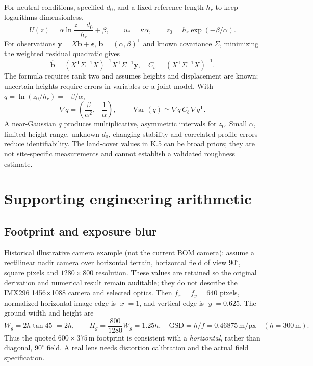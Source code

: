\documentclass[11pt,a4paper]{article}
\numberwithin{equation}{section}
\begin{document}
For neutral conditions, specified $d_0$, and a fixed reference length
$h_r$ to keep logarithms dimensionless,
\begin{equation}
 U(z)=\alpha\ln\frac{z-d_0}{h_r}+\beta,
 \qquad u_*=\kappa\alpha,\qquad
 z_0=h_r\exp(-\beta/\alpha).
\end{equation}
For observations $\boldsymbol y=X\boldsymbol b+\boldsymbol\epsilon$,
$\boldsymbol b=(\alpha,\beta)^{\mathsf T}$ and known covariance $\Sigma$,
minimizing the weighted residual quadratic gives
\begin{equation}
 \widehat{\boldsymbol b}=(X^{\mathsf T}\Sigma^{-1}X)^{-1}
                   X^{\mathsf T}\Sigma^{-1}\boldsymbol y,
 \quad C_b=(X^{\mathsf T}\Sigma^{-1}X)^{-1}.
\end{equation}
The formula requires rank two and assumes heights and displacement are
known; uncertain heights require errors-in-variables or a joint model.
With $q=\ln(z_0/h_r)=-\beta/\alpha$,
\begin{equation}
 \nabla q=\left(\frac{\beta}{\alpha^2},-\frac1\alpha\right),
 \qquad \operatorname{Var}(q)\simeq\nabla q\,C_b\,\nabla q^{\mathsf T}.
\end{equation}
A near-Gaussian $q$ produces multiplicative, asymmetric intervals for
$z_0$. Small $\alpha$, limited height range, unknown $d_0$, changing
stability and correlated profile errors reduce identifiability. The
land-cover values in K.5 can be broad priors; they are not site-specific
measurements and cannot establish a validated roughness estimate.

\section{Supporting engineering arithmetic}
\label{sec:engineering}

\subsection{Footprint and exposure blur}

Historical illustrative camera example (not the current BOM camera): assume a rectilinear nadir camera over horizontal terrain, horizontal field of view $90^\circ$, square pixels and $1280\times800$ resolution. These values are retained so the original derivation and numerical result remain auditable; they do not describe the IMX296 1456$\times$1088 camera and selected optics.
Then $f_x=f_y=640$ pixels, normalized horizontal image edge is $|x|=1$,
and vertical edge is $|y|=0.625$. The ground width and height are
\begin{equation}
 W_g=2h\tan45^\circ=2h,\qquad
 H_g=\frac{800}{1280}W_g=1.25h,
 \quad \mathrm{GSD}=h/f=0.46875\,\mathrm{m/px}\quad(h=300\,\mathrm m).
\end{equation}
Thus the quoted $600\times375\,\mathrm m$ footprint is consistent with
a \emph{horizontal}, rather than diagonal, $90^\circ$ field. A real lens
needs distortion calibration and the actual field specification.
\end{document}
